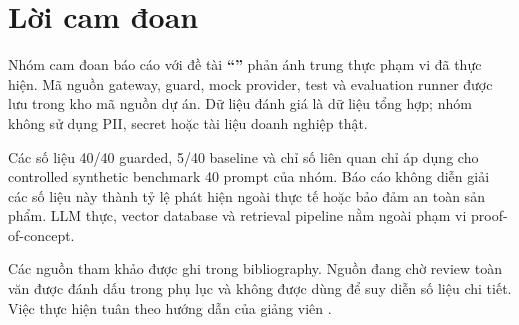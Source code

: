 \chapter*{Lời cam đoan}

Nhóm cam đoan báo cáo với đề tài \textbf{“\titlethesis”} phản ánh trung thực
phạm vi đã thực hiện. Mã nguồn gateway, guard, mock provider, test và evaluation
runner được lưu trong kho mã nguồn dự án. Dữ liệu đánh giá là dữ liệu tổng hợp;
nhóm không sử dụng PII, secret hoặc tài liệu doanh nghiệp thật.

Các số liệu 40/40 guarded, 5/40 baseline và chỉ số liên quan chỉ áp dụng cho
controlled synthetic benchmark 40 prompt của nhóm. Báo cáo không diễn giải các
số liệu này thành tỷ lệ phát hiện ngoài thực tế hoặc bảo đảm an toàn sản phẩm.
LLM thực, vector database và retrieval pipeline nằm ngoài phạm vi proof-of-concept.

Các nguồn tham khảo được ghi trong bibliography. Nguồn đang chờ review toàn văn
được đánh dấu trong phụ lục và không được dùng để suy diễn số liệu chi tiết.
Việc thực hiện tuân theo hướng dẫn của giảng viên \textbf{\supervisor}.
